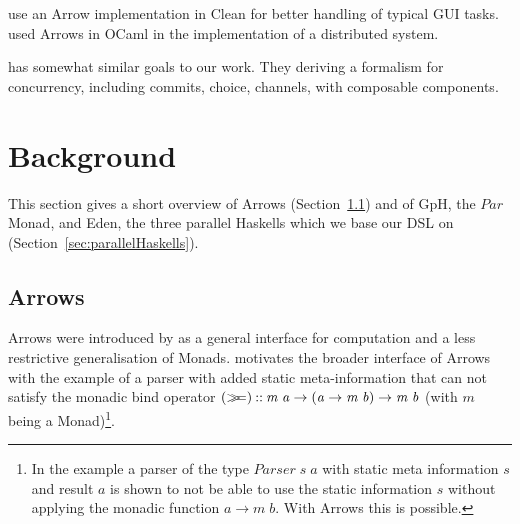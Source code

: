 \documentclass{jfp1}
\newcommand{\Conid}[1]{\mathit{#1}}
\newcommand{\Varid}[1]{\mathit{#1}}
\newcommand{\bind}{\mathbin{>\!\!\!>\mkern-6.7mu=}}
\begin{document}
\citet{achten2004arrows,achten2007arrow} use an Arrow implementation in Clean for better handling of typical GUI tasks. \citet{Dagand:2009:ORD:1481861.1481870} used Arrows in OCaml in the implementation of a distributed system.

\citet{turon_reagents:_2012} has somewhat similar goals to our work. They deriving a formalism for concurrency, including commits, choice, channels, with composable components.

        \section{Background}
	\label{sec:background}
	This section gives a short overview of Arrows
        (Section~\ref{sec:arrows}) and of GpH, the \ensuremath{\Conid{Par}} Monad, and
        Eden, the three parallel Haskells which we base our DSL on
        (Section~\ref{sec:parallelHaskells}).
	\subsection{Arrows}
\label{sec:arrows}
Arrows were introduced by \citet{HughesArrows} as a general interface for computation and a less restrictive generalisation of Monads. \citeauthor{HughesArrows} motivates the broader interface of Arrows with the example of a parser with added static meta-information that can not satisfy the monadic bind operator \ensuremath{(\bind )\mathbin{::}\Varid{m}\;\Varid{a}\to (\Varid{a}\to \Varid{m}\;\Varid{b})\to \Varid{m}\;\Varid{b}} (with \ensuremath{\Varid{m}} being a Monad)\footnote{In the example a parser of the type \ensuremath{\Conid{Parser}\;\Varid{s}\;\Varid{a}} with static meta information \ensuremath{\Varid{s}} and result \ensuremath{\Varid{a}} is shown to not be able to use the static information \ensuremath{\Varid{s}} without applying the monadic function \ensuremath{\Varid{a}\to \Varid{m}\;\Varid{b}}. With Arrows this is possible.}.
\end{document}
